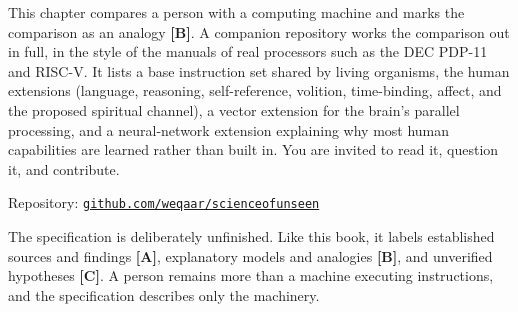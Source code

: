 \begin{keybox}
This chapter compares a person with a computing machine and marks the comparison as an
analogy \textbf{[B]}. A companion repository works the comparison out in full, in the
style of the manuals of real processors such as the DEC PDP-11 and RISC-V. It lists a
base instruction set shared by living organisms, the human extensions (language,
reasoning, self-reference, volition, time-binding, affect, and the proposed spiritual
channel), a vector extension for the brain's parallel processing, and a neural-network
extension explaining why most human capabilities are learned rather than built in. You
are invited to read it, question it, and contribute.

\medskip
\noindent Repository: \href{https://github.com/weqaar/scienceofunseen/tree/main/HISA}{\texttt{github.com/weqaar/scienceofunseen}}

\medskip
\noindent The specification is deliberately unfinished. Like this book, it labels
established sources and findings \textbf{[A]}, explanatory models and analogies
\textbf{[B]}, and unverified hypotheses \textbf{[C]}. A person remains more than a
machine executing instructions, and the specification describes only the machinery.
\end{keybox}
